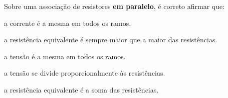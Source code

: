 \blocofixacao
\begin{questao}[1]{}

Sobre uma associação de resistores \textbf{em paralelo}, é correto afirmar que:
\begin{alternativas}
\item a corrente é a mesma em todos os ramos.
\item a resistência equivalente é sempre maior que a maior das resistências.
\item a tensão é a mesma em todos os ramos.
\item a tensão se divide proporcionalmente às resistências.
\item a resistência equivalente é a soma das resistências.
\end{alternativas}


\end{questao}
